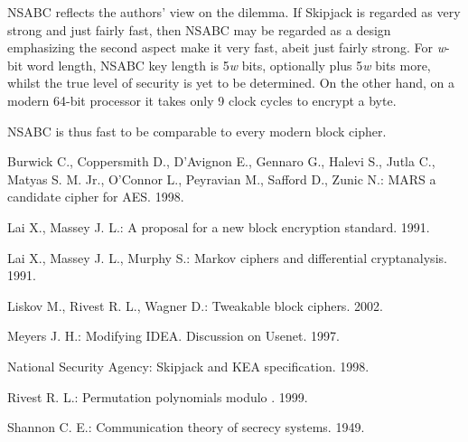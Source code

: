 \documentclass[a4paper,oneside,english]{amsart}
\numberwithin{equation}{section}
\numberwithin{figure}{section}
\begin{document}
NSABC reflects the authors' view on the dilemma. If Skipjack is regarded
as very strong and just fairly fast, then NSABC may be regarded as
a design emphasizing the second aspect \textemdash{} make it very
fast, abeit just fairly strong. For \emph{w}-bit word length, NSABC
key length is 5\emph{w} bits, optionally plus 5\emph{w} bits more,
whilst the true level of security is yet to be determined. On the
other hand, on a modern 64-bit processor it takes only 9 clock cycles
to encrypt a byte.

NSABC is thus fast to be comparable to every modern block cipher.
\begin{thebibliography}{References}
Burwick C., Coppersmith D., D'Avignon E., Gennaro
G., Halevi S., Jutla C., Matyas S. M. Jr., O'Connor L., Peyravian
M., Safford D., Zunic N.: MARS \textemdash{} a candidate cipher for
AES. 1998.

Lai X., Massey J. L.: A proposal for a new block
encryption standard. 1991.

Lai X., Massey J. L., Murphy S.: Markov ciphers
and differential cryptanalysis. 1991.

Liskov M., Rivest R. L., Wagner D.: Tweakable
block ciphers. 2002.

Meyers J. H.: Modifying IDEA. Discussion on
Usenet. 1997.

National Security Agency: Skipjack and KEA
specification. 1998.

Rivest R. L.: Permutation polynomials modulo
. 1999.

Shannon C. E.: Communication theory of secrecy
systems. 1949.

\end{thebibliography}

\end{document}
